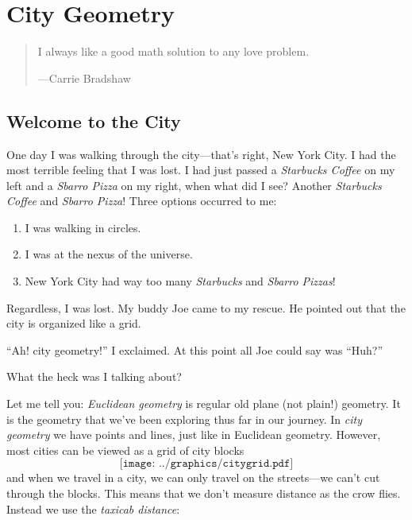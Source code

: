 \chapter{City Geometry}
\begin{quote} 
I always like a good math solution to any love problem.

\hfill---Carrie Bradshaw
%
%
\end{quote}



\section{Welcome to the City}


One day I was walking through the city---that's right, New York City. I
had the most terrible feeling that I was lost. I had just passed a
\textit{Starbucks Coffee} on my left and a \textit{Sbarro Pizza} on my
right, when what did I see? Another \textit{Starbucks Coffee} and
\textit{Sbarro Pizza}! Three options occurred to me:
\begin{enumerate}
\item I was walking in circles.
\item I was at the nexus of the universe.
\item New York City had way too many \textit{Starbucks} and \textit{Sbarro Pizzas}!
\end{enumerate}
Regardless, I was lost. My buddy Joe came to my rescue. He pointed out that the city is organized like a grid. 

``Ah! city geometry!'' I exclaimed. At this point all Joe could say was
``Huh?''


\begin{question} What the heck was I talking about?
\end{question}

Let me tell you: \textit{Euclidean geometry}
is regular old plane (not plain!) geometry. It is the geometry that
we've been exploring thus far in our journey.  In \textit{city
  geometry} we have points and lines, just like in Euclidean geometry.
However, most cities can be viewed as a grid of city blocks
\[
\texttt{[image: ../graphics/citygrid.pdf]}
\]
and when we travel in a city, we can only travel on the streets---we
can't cut through the blocks. This means that we don't measure
distance as the crow flies. Instead we use the \textit{taxicab
  distance}:

